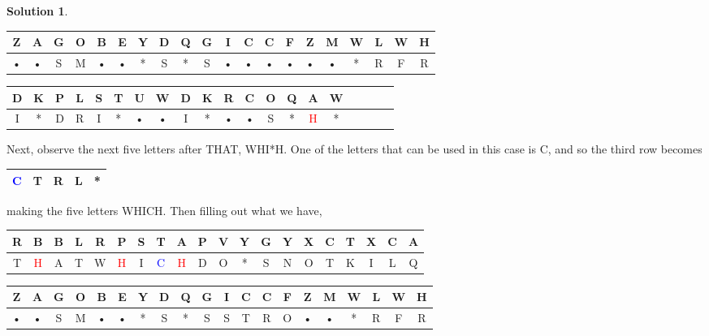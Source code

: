 \documentclass[11pt]{article}
\theoremstyle{definition}\newtheorem{definition}{Definition}
\theoremstyle{definition}\newtheorem{question}{Question}
\theoremstyle{definition}\newtheorem*{solution}{Solution}
\begin{document}
\begin{solution}
\begin{center}
        \begin{tabular}{|cc|cc|cc|cc|cc|cc|cc|cc|cc|cc|} \hline
            Z & A & G & O & B & E & Y & D & Q & G & I & C & C & F & Z & M & W & L & W & H \\ \hline
            • & • & S & M & • & • & * & S & * & S & • & • & • & • & • & • & * & R & F & R \\ \hline
        \end{tabular}

        \begin{tabular}{|cc|cc|cc|cc|cc|cc|cc|cc|cc|cc|} \hline
            D & K & P & L & S & T & U & W & D & K & R & C & O & Q & A & W \\ \hline
            I & * & D & R & I & * & • & • & I & * & • & • & S & * & \textcolor{red}{H} & * \\ \hline
        \end{tabular}
    \end{center}

    Next, observe the next five letters after THAT, WHI*H. One of the letters that can be used in this case is C, and so the third row becomes
    \begin{center}
        \begin{tabular}{|c|c|c|c|c|} \hline
            \textcolor{blue}{C} & T & R & L & * \\ \hline
        \end{tabular}
    \end{center}
    making the five letters WHICH. Then filling out what we have,
    \begin{center}
        \begin{tabular}{|cc|cc|cc|cc|cc|cc|cc|cc|cc|cc|} \hline
            R & B & B & L & R & P & S & T & A & P & V & Y & G & Y & X & C & T & X & C & A \\ \hline
            T & \textcolor{red}{H} & A & T & W & \textcolor{red}{H} & I & \textcolor{blue}{C} & \textcolor{red}{H} & D & O & * & S & N & O & T & K & I & L & Q \\ \hline
        \end{tabular}

        \begin{tabular}{|cc|cc|cc|cc|cc|cc|cc|cc|cc|cc|} \hline
            Z & A & G & O & B & E & Y & D & Q & G & I & C & C & F & Z & M & W & L & W & H \\ \hline
            • & • & S & M & • & • & * & S & * & S & S & T & R & O & • & • & * & R & F & R \\ \hline
        \end{tabular}


\end{center}
\end{solution}
\end{document}

